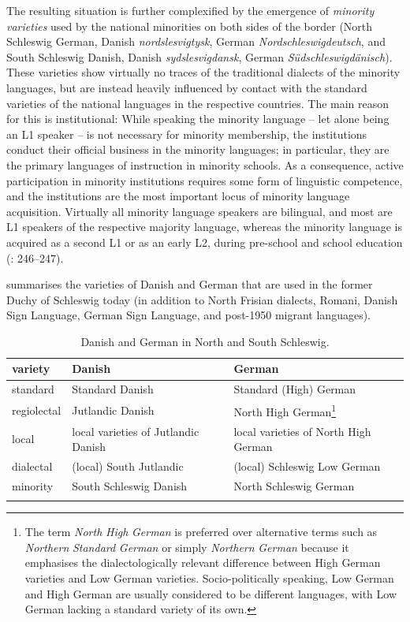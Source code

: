 \documentclass[output=paper]{langsci/langscibook}
\begin{document}
The resulting situation is further complexified by the emergence of \textit{minority} \textit{varieties} used by the national minorities on both sides of the border (North Schleswig German, Danish \textit{nordslesvigtysk}, German \textit{Nordschleswigdeutsch}, and South Schleswig Danish, Danish \textit{sydslesvigdansk}, German \textit{Südschleswigdänisch}). These varieties show virtually no traces of the traditional dialects of the minority languages, but are instead heavily influenced by contact with the standard varieties of the national languages in the respective countries. The main reason for this is institutional: While speaking the minority language – let alone being an L1 speaker – is not necessary for minority membership, the institutions conduct their official business in the minority languages; in particular, they are the primary languages of instruction in minority schools. As a consequence, active participation in minority institutions requires some form of linguistic competence, and the institutions are the most important locus of minority language acquisition. Virtually all minority language speakers are bilingual, and most are L1 speakers of the respective majority language, whereas the minority language is acquired as a second L1 or as an early L2, during pre-school and school education (\citealt{Kuhl.2015}: 246–247).

 summarises the varieties of Danish and German that are used in the former Duchy of Schleswig today (in addition to North Frisian dialects, Romani, Danish Sign Language, German Sign Language, and post-1950 migrant languages).

\begin{table}
\begin{tabularx}{0.95\textwidth}{p{1.7cm} p{} p{4.5cm}}
\lsptoprule
 variety & Danish & German\\
 \hline
standard & Standard Danish & Standard (High) German\\
regiolectal & Jutlandic Danish & North High German\footnote{The term \textit{North} \textit{High} \textit{German} is preferred over alternative terms such as \textit{Northern} \textit{Standard} \textit{German} or simply \textit{Northern} \textit{German} because it emphasises the dialectologically relevant difference between High German varieties and Low German varieties. Socio-politically speaking, Low German and High German are usually considered to be different languages, with Low German lacking a standard variety of its own.}\\
local & local varieties of Jutlandic Danish & local varieties of North High German\\
dialectal & (local) South Jutlandic & (local) Schleswig Low German\\
minority & South Schleswig Danish & North Schleswig German\\
\lspbottomrule
\end{tabularx}
	\caption{Danish and German in North and South Schleswig.}
	\label{tab:hoeder:1}
\end{table}
\end{document}
